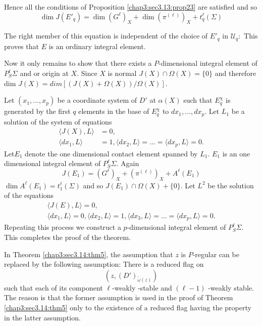 Hence all the conditions of Proposition \ref{chap3:sec3.13:prop23} are satisfied and so 
$$
\dim J(E'_q) = \dim (G^\ell)_X + \dim (\pi^{(\ell) })_X + t^\ell_q (\Sigma) 
$$

The right member of this equation is independent of the choice of \break
$E'_q$ in $\mathcal{U}_q: $ This proves that $E$ is an ordinary
integral element.  

Now it only remains to show that there exists a  $P$-dimensional
integral element of $P_S^\ell \Sigma$ and or origin at $X$. Since $X$
is normal $J(X)\cap \Omega(X) = \{0\}$ and therefore dim $J(X) = dim
[(J(X) + \Omega (X)) / \Omega (X) ]$. 
 
Let $(x_1, \ldots, x_p) $ be a coordinate system of $D'$ at $\alpha
(X)$ such that $E^\chi_q$ is generated by the first $q$ elements in
the base of $E^\chi_q$ to $dx_1, \ldots , dx _p. \text{ Let } L_1 $ be
a solution of the system of  equations  
\begin{align*}
  \langle J(X) , L\rangle & = 0,\\
  \langle dx_1, L\rangle &= 1, \langle dx_2,L\rangle  =\ldots =\langle
  dx_p,L\rangle  = 0.  
\end{align*}
Let\pageoriginale $E_1$ denote the one dimensional contact element spanned by
$L_1$. $E_1$  is an one dimensional integral element of $P^\ell_S \Sigma
$. Again 
$$
J(E_1) = (G^\ell)_X + (\pi ^{(\ell)})_X + A^\ell(E_1) 
$$ 
$\dim A^\ell(E_1) = t^\ell_1 (\Sigma)$  and so  $J(E_1) \cap \Omega
(X) + \{0\}$. Let $L^2 $ be the solution of the equations 
 \begin{gather*}
   \langle J(E) ,L \rangle= 0,\\
   \langle dx_1,L\rangle = 0, \langle dx_2, L \rangle =1, \langle
   dx_3, L \rangle = \ldots = \langle dx_p,L\rangle = 0.   
 \end{gather*} 
 Repeating this process we construct a $p$-dimensional integral element
 of $ P_S^\ell \Sigma $. This completes the proof of the theorem. 
 
\begin{remark*}
In Theorem \ref{chap3:sec3.14:thm5}, the assumption that $z$ is
$P$-regular can be 
   replaced by the following assumption: There is a reduced flag on
$$
(z,(D')_{\tilde\omega(z)}) 
$$ 
such that each of its component
   $\ell$-weakly -stable and $ (\ell-1)$ -weakly stable. The reason is
   that the former assumption is used in the proof of
   Theorem \ref{chap3:sec3.14:thm5} only
   to the existence of a reduced flag having the property in the
   latter assumption.  
\end{remark*}  
 
